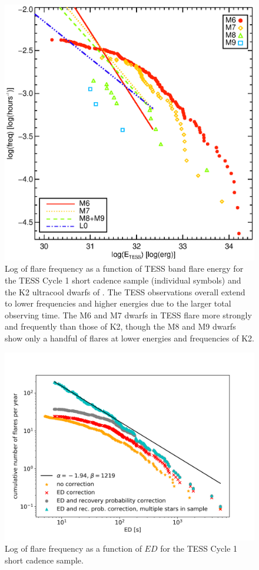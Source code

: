 \documentclass{aastex62}
\begin{document}
\begin{figure}
	\includegraphics[width=0.5\columnwidth]{FFD_v6.eps}
    \caption{Log of flare frequency as a function of TESS band flare energy for the TESS Cycle 1 short cadence sample (individual symbols) and the K2 ultracool dwarfs of  \citet{Paudel2017}. The TESS observations overall extend to lower frequencies and higher energies due to the larger total observing time. The M6 and M7 dwarfs in TESS flare more strongly and frequently than those of K2, though the M8 and M9 dwarfs show only a handful of flares at lower energies and frequencies of K2.  }
    \label{fig:ffd}
\end{figure}

\begin{figure}
	\includegraphics[width=0.5\columnwidth]{12_03_2020_13_03_full_sample_ffd.png}
    \caption{Log of flare frequency as a function of $ED$ for the TESS Cycle 1 short cadence sample.}
    \label{fig:ffd_all_ed}
\end{figure}
\end{document}
